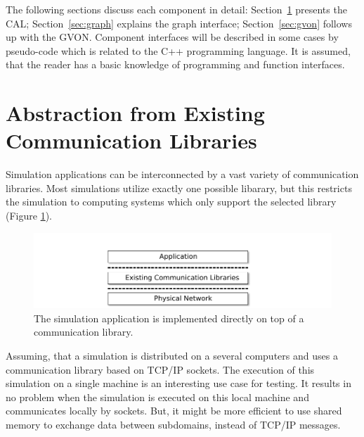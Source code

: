 \noindent The following sections discuss each component in detail:
Section~\ref{sec:comm_abstraction} presents the CAL;
Section~\ref{sec:graph} explains the graph interface;
Section~\ref{sec:gvon} follows up with the GVON.  Component interfaces
will be described in some cases by pseudo-code which is related to the
C++ programming language. It is assumed, that the reader has a basic
knowledge of programming and function interfaces.

\section{Abstraction from Existing Communication Libraries}
\label{sec:comm_abstraction}

Simulation applications can be interconnected by a vast variety of
communication libraries. Most simulations utilize exactly one possible
libarary, but this restricts the simulation to computing systems which
only support the selected library (Figure
\ref{fig:design_state_of_the_art}).

\begin{figure}[H]
  \centering \includegraphics[width=\textwidth]{graphics/30_design_state_of_the_art}
  \caption{The simulation application is implemented directly on top
    of a communication library.}
  \label{fig:design_state_of_the_art}
\end{figure}

Assuming, that a simulation is distributed on a several computers and uses a
communication library based on TCP/IP sockets. The execution of this
simulation on a single machine is an interesting use case for
testing. It results in no problem when the simulation is executed on
this local machine and communicates locally by sockets.  But, it might
be more efficient to use shared memory to exchange data between
subdomains, instead of TCP/IP messages.

